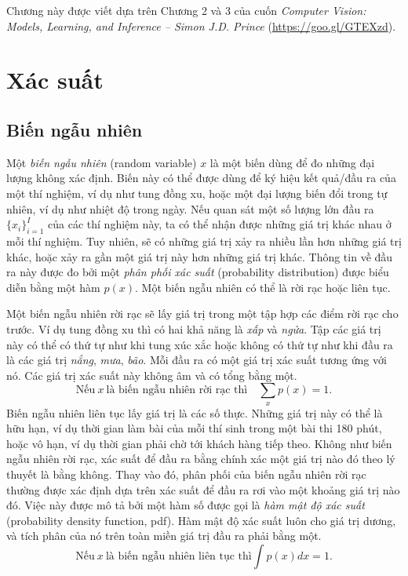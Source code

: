 {Chương này được viết dựa trên Chương 2 và 3 của cuốn \textit{Computer Vision:  Models, Learning, and Inference -- Simon J.D. Prince} (\url{https://goo.gl/GTEXzd}).}

\section{Xác suất}


\subsection{Biến ngẫu nhiên}

Một \textit{biến ngẫu nhiên} (random variable) $x$ là một biến dùng để đo những đại lượng không
xác định. Biến này có thể được dùng để ký hiệu kết quả/đầu ra của một thí
nghiệm, ví dụ như tung đồng xu, hoặc một đại lượng biến đổi trong tự nhiên, ví
dụ như nhiệt độ trong ngày. Nếu quan sát một số lượng lớn đầu ra
$\{x_i\}_{i=1}^I$ của các thí nghiệm này, ta có thể nhận được những giá trị khác
nhau ở mỗi thí nghiệm. Tuy nhiên, sẽ có những giá trị xảy ra nhiều lần hơn những
giá trị khác, hoặc xảy ra gần một giá trị này hơn những giá trị khác. Thông tin
về đầu ra này được đo bởi một \textit{phân phối xác suất} (probability distribution) được biểu diễn bằng
một hàm $p(x)$. Một biến ngẫu nhiên có thể là {rời rạc} hoặc {liên
tục}.

Một biến ngẫu nhiên rời rạc sẽ lấy giá trị trong một tập hợp các điểm rời rạc
cho trước. Ví dụ tung đồng xu thì có hai khả năng là \textit{xấp} và
\textit{ngửa}. Tập các giá trị này có thể có thứ tự như khi tung xúc xắc hoặc
không có thứ tự như khi đầu ra là các giá trị \textit{nắng}, \textit{mưa},
\textit{bão}. Mỗi đầu ra có một giá trị xác suất tương ứng với nó. Các giá trị
xác suất này không âm và có tổng bằng một.
\begin{equation}
\label{eqn:30_1}
\text{Nếu}~ x ~\text{là biến ngẫu nhiên rời rạc thì}\quad \sum_{x} p(x) = 1.
\end{equation}
Biến ngẫu nhiên liên tục lấy giá trị là các số thực. Những giá trị này có thể là
hữu hạn, ví dụ thời gian làm bài của mỗi thí sinh trong một bài thi 180 phút,
hoặc vô hạn, ví dụ thời gian phải chờ tới khách hàng tiếp theo. Không như biến
ngẫu nhiên rời rạc, xác suất để đầu ra bằng {chính xác} một giá trị nào đó theo
lý thuyết là bằng không. Thay vào đó, phân phối của biến ngẫu nhiên rời rạc
thường được xác định dựa trên xác suất để đầu ra rơi vào một khoảng giá trị nào
đó. Việc này được mô tả bởi một hàm số được gọi là \textit{hàm mật độ xác suất} (probability density function, pdf). Hàm mật độ xác suất
luôn cho giá trị dương, và tích phân của nó trên toàn miền giá trị đầu ra phải
bằng một.
\begin{equation}
\label{eqn:30_2}
\text{Nếu}~ x ~\text{là biến ngẫu nhiên liên tục thì} \int p(x)dx = 1.
\end{equation}

